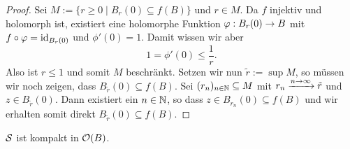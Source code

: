 \begin{proof}
  Sei $M:= \{ r\geq 0\mid B_r(0) \subseteq f(B) \}$ und $r \in M$. Da $f$ injektiv und
  holomorph ist, existiert eine holomorphe Funktion $\phi: B_r(0) \ra
  B$ mit $f \circ \phi = \id_{B_r(0)}$ und $\phi'(0) = 1$. Damit wissen
  wir aber
  \[
  1 = \phi'(0) \leq \frac{1}{r}.
  \]
  Also ist $r \leq 1$ und somit $M$ beschränkt. Setzen wir nun $\tilde
  r := \sup M$, so müssen wir noch zeigen, dass $B_{\tilde r}(0) \subseteq
  f(B)$.
  Sei $(r_n)_{n \in \N}\subseteq M$ mit $r_n \xrightarrow{n \ra
    \infty} \tilde r$ und $z \in B_{\tilde r}(0)$. Dann existiert ein $n \in \N$,
  so dass $z \in B_{r_n}(0)\subseteq f(B)$ und wir erhalten somit direkt
  $B_{\tilde r}(0) \subseteq f(B)$.
\end{proof}

\begin{thm}
  \label{thm:schlicht-kompakt}
  $\S$ ist kompakt in $\hol(B)$.
\end{thm}

